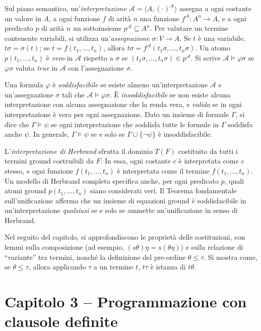 \documentclass[12pt]{article}
\begin{document}
Sul piano semantico, un'\emph{interpretazione} $\mathcal{A} = \langle A,(\cdot)^\mathcal{A}\rangle$ assegna a ogni costante un valore in $A$, a ogni funzione $f$ di arità $n$ una funzione $f^\mathcal{A}:A^n\to A$, e a ogni predicato $p$ di arità $n$ un sottoinsieme $p^\mathcal{A}\subseteq A^n$. Per valutare un termine contenente variabili, si utilizza un'\emph{assegnazione} $\sigma:V\to A$. Se $t$ è una variabile, $t\sigma=\sigma(t)$; se $t=f(t_1,\dots,t_n)$, allora $t\sigma = f^\mathcal{A}(t_1\sigma,\dots,t_n\sigma)$. Un atomo $p(t_1,\dots,t_n)$ è \emph{vero} in $\mathcal{A}$ rispetto a $\sigma$ se $(t_1\sigma,\dots,t_n\sigma)\in p^\mathcal{A}$. Si scrive $\mathcal{A}\models \varphi\sigma$ se $\varphi\sigma$ valuta \emph{true} in $\mathcal{A}$ con l'assegnazione $\sigma$.

Una formula $\varphi$ è \emph{soddisfacibile} se esiste almeno un'interpretazione $\mathcal{A}$ e un'assegnazione $\sigma$ tali che $\mathcal{A}\models\varphi\sigma$. È \emph{insoddisfacibile} se non esiste alcuna interpretazione con alcuna assegnazione che la renda vera, e \emph{valida} se in ogni interpretazione è vera per ogni assegnazione. Dato un insieme di formule $\Gamma$, si dice che $\Gamma\models \psi$ se ogni interpretazione che soddisfa tutte le formule in $\Gamma$ soddisfa anche $\psi$. In generale, $\Gamma\models\psi$ se e solo se $\Gamma\cup\{\neg\psi\}$ è insoddisfacibile.

L'\emph{interpretazione di Herbrand} sfrutta il dominio $T(F)$ costituito da tutti i termini ground costruibili da $F$. In essa, ogni costante $c$ è interpretata come $c$ stesso, e ogni funzione $f(t_1,\dots,t_n)$ è interpretata come il termine $f(t_1,\dots,t_n)$. Un modello di Herbrand completa specifica anche, per ogni predicato $p$, quali atomi ground $p(t_1,\dots,t_n)$ siano considerati veri. Il Teorema fondamentale sull'unificazione afferma che un insieme di equazioni ground è soddisfacibile in un'interpretazione \emph{qualsiasi} se e solo se ammette un'unificazione in senso di Herbrand.

Nel seguito del capitolo, si approfondiscono le proprietà delle sostituzioni, con lemmi sulla composizione (ad esempio, $(s\theta)\eta = s(\theta\eta)$) e sulla relazione di ``variante'' tra termini, nonché la definizione del pre-ordine $\theta\leq\tau$. Si mostra come, se $\theta\leq\tau$, allora applicando $\tau$ a un termine $t$, $t\tau$ è istanza di $t\theta$.

\section*{Capitolo 3 – Programmazione con clausole definite}
\end{document}
